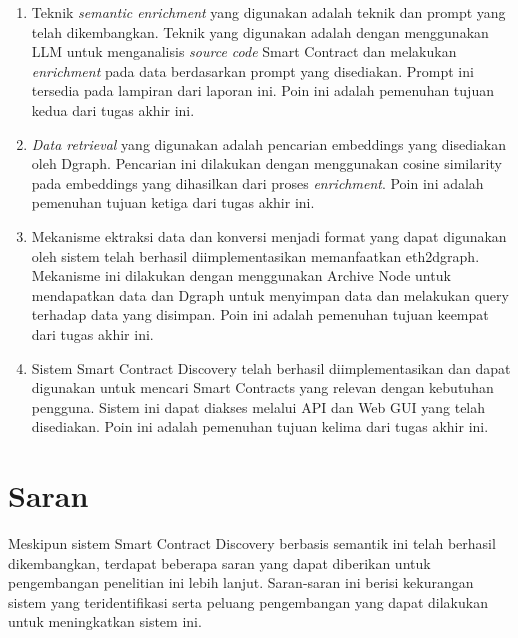 \begin{enumerate}
    \item Teknik \textit{semantic enrichment} yang digunakan adalah teknik dan prompt yang telah dikembangkan. Teknik yang digunakan adalah dengan menggunakan LLM untuk menganalisis \textit{source code} Smart Contract dan melakukan \textit{enrichment} pada data berdasarkan prompt yang disediakan. Prompt ini tersedia pada lampiran dari laporan ini. Poin ini adalah pemenuhan tujuan kedua dari tugas akhir ini.
    \item \textit{Data retrieval} yang digunakan adalah pencarian embeddings yang disediakan oleh Dgraph. Pencarian ini dilakukan dengan menggunakan cosine similarity pada embeddings yang dihasilkan dari proses \textit{enrichment}. Poin ini adalah pemenuhan tujuan ketiga dari tugas akhir ini.
    \item Mekanisme ektraksi data dan konversi menjadi format yang dapat digunakan oleh sistem telah berhasil diimplementasikan memanfaatkan eth2dgraph. Mekanisme ini dilakukan dengan menggunakan Archive Node untuk mendapatkan data dan Dgraph untuk menyimpan data dan melakukan query terhadap data yang disimpan. Poin ini adalah pemenuhan tujuan keempat dari tugas akhir ini.
    \item Sistem Smart Contract Discovery telah berhasil diimplementasikan dan dapat digunakan untuk mencari Smart Contracts yang relevan dengan kebutuhan pengguna. Sistem ini dapat diakses melalui API dan Web GUI yang telah disediakan. Poin ini adalah pemenuhan tujuan kelima dari tugas akhir ini.
\end{enumerate}
 
\section{Saran}
Meskipun sistem Smart Contract Discovery berbasis semantik ini telah berhasil dikembangkan, terdapat beberapa saran yang dapat diberikan untuk pengembangan penelitian ini lebih lanjut. Saran-saran ini berisi kekurangan sistem yang teridentifikasi serta peluang pengembangan yang dapat dilakukan untuk meningkatkan sistem ini.

